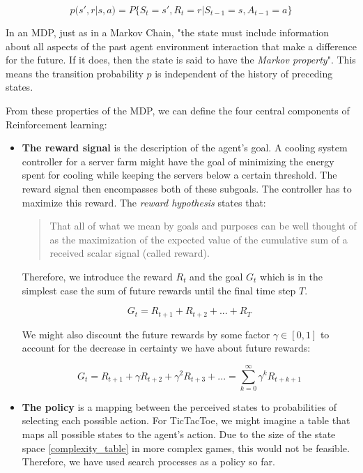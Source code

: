 \begin{equation}
    p(s', r | s, a) = P\{S_t=s', R_t = r | S_{t-1} = s, A_{t-1}=a\}
\end{equation}

In an MDP, just as in a Markov Chain, "the state must include information about all aspects of the past agent environment interaction that make a difference for the future. If it does, then the state is said to have the \textit{Markov property}". \cite[p. 48]{sutton_reinforcement_2018} This means the transition probability $p$ is independent of the history of preceding states.

From these properties of the MDP, we can define the four central components of Reinforcement learning:

\begin{itemize}
    \item \textbf{The reward signal} is the description of the agent's goal. A cooling system controller for a server farm might have the goal of minimizing the energy spent for cooling while keeping the servers below a certain threshold. The reward signal then encompasses both of these subgoals. The controller has to maximize this reward. The \textit{reward hypothesis} states that:
          \begin{quotation}
              That all of what we mean by goals and purposes can be well thought of as the maximization of the expected value of the cumulative sum of a received scalar signal (called reward). \cite[p. 52]{sutton_reinforcement_2018}
          \end{quotation}
          Therefore, we introduce the reward $R_t $ and the goal $ G_t $ which is in the simplest case the sum of future rewards until the final time step $T$.

          \begin{equation}
              G_t = R_{t+1} + R_{t+2} + ... + R_T
          \end{equation}

          We might also discount the future rewards by some factor $\gamma \in [0, 1] $ to account for the decrease in certainty we have about future rewards:

          \begin{equation}
              G_t = R_{t+1} + \gamma R_{t+2} + \gamma^2 R_{t+3} + ... = \sum_{k=0}^{\infty} \gamma^kR_{t+k+1}
          \end{equation}

    \item \textbf{The policy} is a mapping between the perceived states to probabilities of selecting each possible action. For TicTacToe, we might imagine a table that maps all possible states to the agent's action. Due to the size of the state space \ref{complexity_table} in more complex games, this would not be feasible. Therefore, we have used search processes as a policy so far.


\end{itemize}
